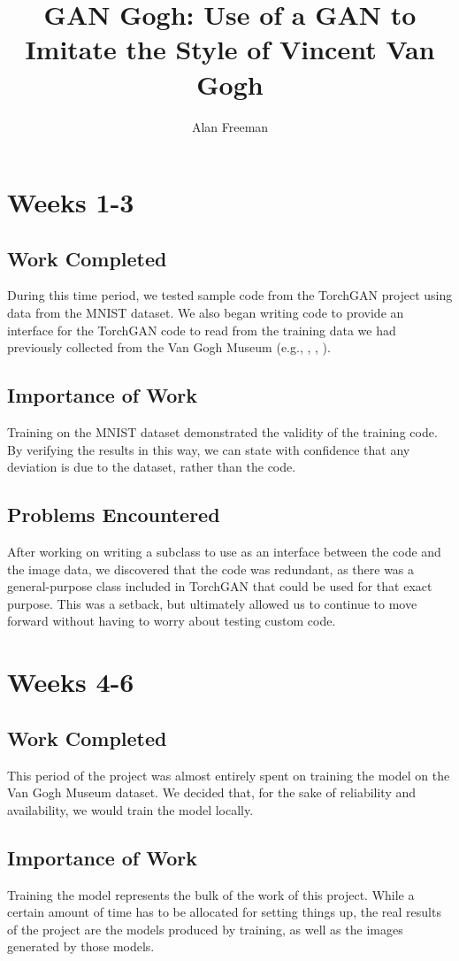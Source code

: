 \documentclass[12pt,letterpaper]{article}
\author{Alan Freeman}
\title{GAN Gogh: Use of a GAN to Imitate the Style of Vincent Van Gogh}
\begin{document}
	\maketitle
	\section{Weeks 1-3}
	\subsection{Work Completed}
	During this time period, we tested sample code from the TorchGAN\cite{pal2019torchgan} project using data from the MNIST\cite{lecun2010mnist} dataset.
	We also began writing code to provide an interface for the TorchGAN code to read from the training data we had previously collected from the Van Gogh Museum (e.g., \cite{001}, \cite{002}, \cite{003}).
	
	\subsection{Importance of Work}
	Training on the MNIST dataset demonstrated the validity of the training code. 
	By verifying the results in this way, we can state with confidence that any deviation is due to the dataset, rather than the code.
	
	\subsection{Problems Encountered}
	After working on writing a subclass to use as an interface between the code and the image data, we discovered that the code was redundant, as there was a general-purpose class included in TorchGAN that could be used for that exact purpose. This was a setback, but ultimately allowed us to continue to move forward without having to worry about testing custom code.

	\section{Weeks 4-6}
	\subsection{Work Completed}
	This period of the project was almost entirely spent on training the model on the Van Gogh Museum dataset. We decided that, for the sake of reliability and availability, we would train the model locally.
	\subsection{Importance of Work}
	Training the model represents the bulk of the work of this project. While a certain amount of time has to be allocated for setting things up, the real results of the project are the models produced by training, as well as the images generated by those models.
\end{document}
